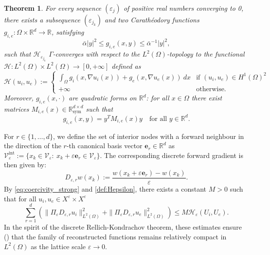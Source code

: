 \documentclass[a4paper,11pt]{article}
\newtheorem{theorem}{Theorem}[section]
\theoremstyle{definition}
\numberwithin{equation}{section}
\newcommand{\e}{\varepsilon}
\newcommand{\R}{\mathbb{R}}
\newcommand{\V}{\mathcal{V}}
\begin{document}
\begin{theorem}
	\label{th:ac04}
	For every sequence $(\e_j)$ of positive real numbers converging to 0, there exists a subsequence $(\e_{j_k})$ and two Carath\'eodory functions $g_{i,e}:\Omega \times \R^d \to \R$, satisfying
	\[
	\bar\alpha |y|^2 \leq g_{i,e}(x,y) \leq \bar\alpha^{-1} |y|^2,
	\]
	such that $\mathcal{H}_{\e_{j_k}}$ $\Gamma$-converges with respect to the $L^2(\Omega)$-topology to the functional $\mathcal{H}:L^2(\Omega)\times L^2(\Omega) \to [0,+\infty]$ defined as
	\begin{equation}
		\label{def:H}
		\mathcal{H}(u_i,u_e):=
		\begin{cases}
			\displaystyle \int_\Omega g_i(x,\nabla u_i(x)) +g_e(x,\nabla u_e(x))\ d x &\text{if } (u_i,u_e)\in H^1(\Omega)^2 \\
			+\infty &\text{otherwise.}
		\end{cases}
	\end{equation}
	Moreover, $g_{i,e}(x,\cdot)$ are quadratic forms on $\R^d$: for all $x\in \Omega$ there exist matrices $M_{i,e}(x)\in \R_\text{sym}^{d \times d}$ such that 
	\begin{equation}
		\label{eq:defMie}
		g_{i,e}(x,y)=y^TM_{i,e}(x)y\quad \text{for all }y\in \R^d.
	\end{equation}
\end{theorem}




For $r\in\{1,\dots,d\}$, we define the set of interior nodes with a forward neighbour in the direction of the $r$-th canonical basis vector $\mathbf{e}_r \in \mathbb{R}^d$ as $\V_\e^{\mathrm{int}} :=\{x_k\in \V_\e:\ x_k+\e \mathbf{e}_r\in \V_\e\}$. The corresponding discrete forward gradient is then given by:
\[D_{\e,r}w(x_k):=\frac{w(x_k+\e \mathbf{e}_r)-w(x_k)}{\e}.\]
By \eqref{eq:coercivity_strong} and \eqref{def:Hepsilon}, there exists a constant $M>0$ such that for all $u_i,u_e\in X^\e\times X^\e$
\begin{equation}
	\label{eq:grad-control}
	\sum_{r=1}^d \left(\|\Pi_\e D_{\e,r} u_i\|_{L^2(\Omega)}^2 +\|\Pi_\e D_{\e,r} u_e\|_{L^2(\Omega)}^2 \right)\le M \mathcal{H}_\e(U_i,U_e).
\end{equation}
In the spirit of the discrete Rellich-Kondrachov theorem, these estimates ensure (\cite{AC04}) that the family of reconstructed functions remains relatively compact in $L^2(\Omega)$ as the lattice scale $\e \to 0$.
\end{document}
